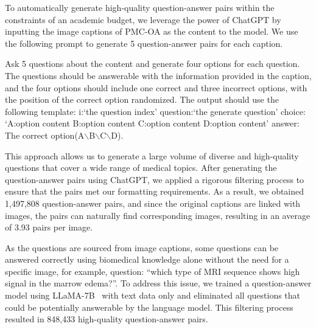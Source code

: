 \documentclass{article}
\begin{document}
To automatically generate high-quality question-answer pairs within the constraints of an academic budget, we leverage the power of ChatGPT by inputting the image captions of PMC-OA as the content to the model. 
We use the following prompt to generate 5 question-answer pairs for each caption.

\colorbox[RGB]{230,230,230}{
    \footnotesize
    \parbox{0.95\textwidth}
    {
    Ask 5 questions about the content and generate four options for each question. The questions should be answerable with the information provided in the caption, and the four options should include one correct and three incorrect options, with the position of the correct option randomized. The output should use the following template: i:`the question index' question:`the generate question' choice: `A:option content B:option content C:option content D:option content'  answer: The correct option(A$\backslash$B$\backslash$C$\backslash$D).  
    }
}

This approach allows us to generate a large volume of diverse and high-quality questions that cover a wide range of medical topics.
After generating the question-answer pairs using ChatGPT, we applied a rigorous filtering process to ensure that the pairs met our formatting requirements. As a result, we obtained 1,497,808 question-answer pairs, and since the original captions are linked with images, the pairs can naturally find corresponding images, resulting in an average of 3.93 pairs per image.



As the questions are sourced from image captions,
some questions can be answered correctly using biomedical knowledge alone without the need for a specific image, for example, question: ``which type of MRI sequence shows high signal in the marrow edema?''.
To address this issue, we trained a question-answer model using LLaMA-7B~\cite{touvron2023llama} with text data only and eliminated all questions that could be potentially answerable by the language model. This filtering process resulted in 848,433 high-quality question-answer pairs.
\end{document}
